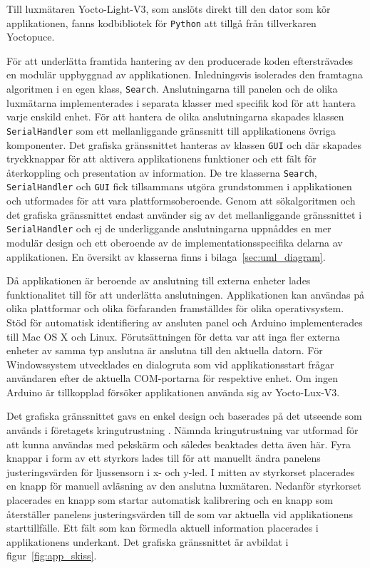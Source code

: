             Till luxmätaren Yocto-Light-V3, som anslöts direkt till den dator som kör applikationen, fanns kodbibliotek för \texttt{Python} att tillgå från tillverkaren Yoctopuce. \bigskip

            För att underlätta framtida hantering av den producerade koden eftersträvades en modulär uppbyggnad av applikationen. Inledningsvis isolerades den framtagna algoritmen i en egen klass, \texttt{Search}. Anslutningarna till panelen och de olika luxmätarna implementerades i separata klasser med specifik kod för att hantera varje enskild enhet. För att hantera de olika anslutningarna skapades klassen \texttt{SerialHandler} som ett mellanliggande gränssnitt till applikationens övriga komponenter. Det grafiska gränssnittet hanteras av klassen \texttt{GUI} och där skapades tryckknappar för att aktivera applikationens funktioner och ett fält för återkoppling och presentation av information. De tre klasserna \texttt{Search}, \texttt{SerialHandler} och \texttt{GUI} fick tillsammans utgöra grundstommen i applikationen och utformades för att vara plattformsoberoende. Genom att sökalgoritmen och det grafiska gränssnittet endast använder sig av det mellanliggande gränssnittet i \texttt{SerialHandler} och ej de underliggande anslutningarna uppnåddes en mer modulär design och ett oberoende av de implementationsspecifika delarna av applikationen. En översikt av klasserna finns i bilaga~\ref{sec:uml_diagram}. \bigskip

            Då applikationen är beroende av anslutning till externa enheter lades funktionalitet till för att underlätta anslutningen. Applikationen kan användas på olika plattformar och olika förfaranden framställdes för olika operativsystem. Stöd för automatisk identifiering av ansluten panel och Arduino implementerades till Mac OS X och Linux. Förutsättningen för detta var att inga fler externa enheter av samma typ anslutna är anslutna till den aktuella datorn. För Windowssystem utvecklades en dialogruta som vid applikationsstart frågar användaren efter de aktuella COM-portarna för respektive enhet. Om ingen Arduino är tillkopplad försöker applikationen använda sig av Yocto-Lux-V3. \bigskip

            Det grafiska gränssnittet gavs en enkel design och baserades på det utseende som används i företagets kringutrustning \cite{solarremote}. Nämnda kringutrustning var utformad för att kunna användas med pekskärm och således beaktades detta även här. Fyra knappar i form av ett styrkors lades till för att manuellt ändra panelens justeringsvärden för ljussensorn i x- och y-led. I mitten av styrkorset placerades en knapp för manuell avläsning av den anslutna luxmätaren. Nedanför styrkorset placerades en knapp som startar automatisk kalibrering och en knapp som återställer panelens justeringsvärden till de som var aktuella vid applikationens starttillfälle. Ett fält som kan förmedla aktuell information placerades i applikationens underkant. Det grafiska gränssnittet är avbildat i figur~\ref{fig:app_skiss}.

